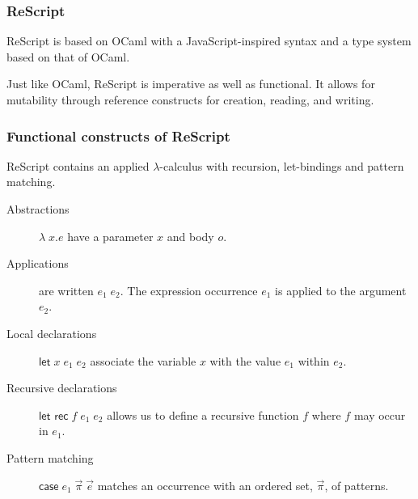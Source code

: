 \documentclass{beamer}
\begin{document}
\begin{frame}
  \frametitle{ReScript}

  ReScript is based on OCaml with a JavaScript-inspired syntax and a
  type system based on that of OCaml. 


  Just like OCaml, ReScript is imperative as well as functional. It
  allows for mutability through reference constructs for creation,
  reading, and writing.
  
\end{frame}




\begin{frame}
  \frametitle{Functional constructs of ReScript}

  ReScript contains an applied $\lambda$-calculus with recursion,
  let-bindings and pattern matching.
  
 \begin{description}
  \item[Abstractions] $\lambda\;x.e$ have a parameter $x$ and
body $o$.  

\item[Applications] are written $e_1\;e_2$. The expression occurrence
  $e_1$ is applied to the argument $e_2$.

\item[Local declarations] $\textsf{let} \; x \; e_1 \; e_2$ associate
the variable $x$ with the value $e_1$ within $e_2$.

\item[Recursive declarations]
$\textsf{let rec} \; f \; e_1 \; e_2$ allows us to define a recursive
function $f$ where $f$ may occur in $e_1$.

\item[Pattern matching] $\textsf{case} \; e_1 \; \vec{\pi} \; \vec{e}$
  matches an occurrence with an ordered set, $\vec{\pi}$, of
  patterns. 
\end{description}

\end{frame}
\end{document}
